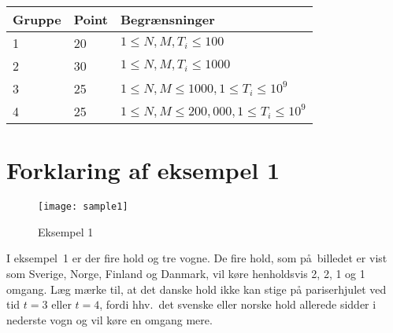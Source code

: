 \noindent
\begin{tabular}{l l l}
Gruppe & Point & Begrænsninger \\ \hline
1     & 20    & $1 \le N, M, T_i \le 100$ \\ 
2     & 30    & $1 \le N, M, T_i \le 1000$ \\
3     & 25    & $1 \le N, M \le 1000, 1 \le T_i \le 10^9$ \\
4     & 25    & $1 \le N, M \le 200,000, 1 \le T_i \le 10^9$ 
\end{tabular}

\section*{Forklaring af eksempel 1}

\begin{figure}[h]
	\centering
\texttt{[image: sample1]}
\caption{Eksempel 1}
\end{figure}

I eksempel~1 er der fire hold og tre vogne.
De fire hold, som på billedet er vist som Sverige, Norge, Finland og Danmark, vil køre henholdsvis 2, 2, 1 og 1 omgang.
Læg mærke til, at det danske hold ikke kan stige på pariserhjulet ved tid $t=3$ eller $t=4$, fordi hhv.\ det svenske eller norske hold allerede sidder i nederste vogn og vil køre en omgang mere.
